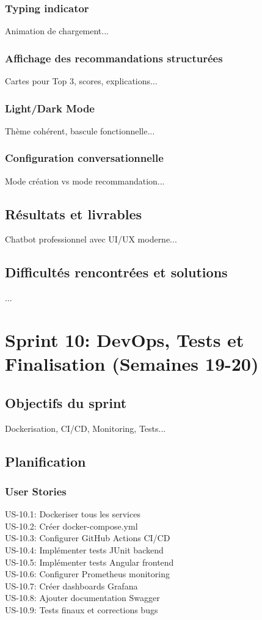 \documentclass[12pt,a4paper]{report}
\begin{document}
\subsubsection{Typing indicator}
Animation de chargement...

\subsubsection{Affichage des recommandations structurées}
Cartes pour Top 3, scores, explications...

\subsubsection{Light/Dark Mode}
Thème cohérent, bascule fonctionnelle...

\subsubsection{Configuration conversationnelle}
Mode création vs mode recommandation...

\subsection{Résultats et livrables}
Chatbot professionnel avec UI/UX moderne...

\subsection{Difficultés rencontrées et solutions}
...

\section{Sprint 10: DevOps, Tests et Finalisation (Semaines 19-20)}
\subsection{Objectifs du sprint}
Dockerisation, CI/CD, Monitoring, Tests...

\subsection{Planification}
\subsubsection{User Stories}
US-10.1: Dockeriser tous les services \\
US-10.2: Créer docker-compose.yml \\
US-10.3: Configurer GitHub Actions CI/CD \\
US-10.4: Implémenter tests JUnit backend \\
US-10.5: Implémenter tests Angular frontend \\
US-10.6: Configurer Prometheus monitoring \\
US-10.7: Créer dashboards Grafana \\
US-10.8: Ajouter documentation Swagger \\
US-10.9: Tests finaux et corrections bugs
\end{document}

